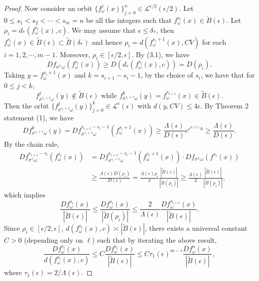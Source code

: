 \documentclass[11pt,oneside]{article}
\theoremstyle{plain}
\numberwithin{equation}{section}
\numberwithin{figure}{section}
\numberwithin{table}{section}
\begin{document}
\begin{proof}
Now consider an orbit $\{ f_{\omega}^j(x)\}_{j=0}^n \in \mathcal L^{\epsilon/2}(\epsilon/2)$. Let $0 \leq s_1 < s_2 < \cdots < s_m = n$ be all the integers such that $f_{\omega}^{s_i}(x) \in \tilde B(\epsilon)$. Let $\rho_i = d_*(f_{\omega}^{s_i}(x), c)$. We may assume that $\epsilon \leq \delta_*$, then $f_{\omega}^{s_i}(x) \in \tilde B(\epsilon) \subset \tilde B(\delta_*)$ and hence  $\rho_i = d (f_{\omega}^{s_i+1}(x), CV)$ for each $i = 1, 2, \cdots, m-1$. Moreover, $\rho_i \in [\epsilon/2, \epsilon]$. By (3.1), we have
\[
Df_{\sigma^{s_i} \omega}(f_{\omega}^{s_i}(x)) \geq D(d_*(f_{\omega}^{s_i}(x), c)) = D(\rho_i).
\]
Taking $y = f_{\omega}^{s_i+1}(x)$ and $k = s_{i+1} - s_i -1$, by the choice of $s_i$, we have that for $0 \leq j < k$,
\[
f_{\sigma^{s_i +1}\omega}^j (y) \notin \tilde B(\epsilon) \text{ while } f_{\sigma^{s_i +1}\omega}^k(y) = f_{\omega}^{s_{i+1}}(x) \in \tilde B(\epsilon). 
\]
Then the orbit $\{f_{\sigma^{s_i +1}\omega}^j (y) \}_{j=0}^k \in \mathcal L^{\epsilon}(\epsilon)$ with $d(y, CV) \leq 4\epsilon$. By Theorem 2 statement (1), we have  
\[
Df_{\sigma^{s_i +1}\omega}^k (y) = Df_{\sigma^{s_i +1}\omega}^{s_{i+1} - s_i -1}(f_{\omega}^{s_i+1}(x)) \geq \frac{\Lambda(\epsilon)}{D(\epsilon)} e^{\epsilon^{\alpha(\epsilon)}k} \geq \frac{\Lambda(\epsilon)}{D(\epsilon)}.
\]
By the chain rule,
\begin{align*}
Df_{\sigma^{s_i} \omega}^{s_{i+1} - s_i }(f_{\omega}^{s_i}(x)) & = Df_{\sigma^{s_i +1}\omega}^{s_{i+1} - s_i -1}(f_{\omega}^{s_i+1}(x)) \cdot Df_{\sigma^{s_i}\omega}(f^{s_i}(x)) \\ & 
\geq \frac{\Lambda(\epsilon) D(\rho_i)}{D(\epsilon)} 
= \frac{\Lambda(\epsilon) \rho_i}{\delta} \frac{|\tilde B(\epsilon)|}{|\tilde B(\rho_i)|} \geq \frac{\Lambda(\epsilon) }{2} \frac{|\tilde B(\epsilon)|}{|\tilde B(\rho_i)|},
\end{align*}
which implies 
\[
\frac{Df_{\omega}^{s_i}(x)}{|\tilde B(\epsilon)|} \leq \frac{Df_{\omega}^{s_i}(x)}{|\tilde B(\rho_i)|} \leq \frac{2}{\Lambda(\epsilon)} \frac{Df_{\omega}^{s_{i+1}}(x)}{|\tilde B(\epsilon)|}.
\]
Since $\rho_i \in [\epsilon/2, \epsilon]$, $d(f_{\omega}^{s_i}(x), c) \asymp |\tilde B(\epsilon)|$, there exists a universal constant $C>0$ (depending only on $\ell$) such that by iterating the above result, 
\begin{equation}
\frac{Df_{\omega}^{s_i}(x)}{d(f_{\omega}^{s_i}(x), c)} \leq C \frac{Df_{\omega}^{s_i}(x)}{|\tilde B(\epsilon)|} \leq C \tau_1(\epsilon)^{m-i} \frac{Df_{\omega}^{n}(x)}{|\tilde B(\epsilon)|}, 
\end{equation}
where $\tau_1(\epsilon) = 2/\Lambda(\epsilon)$.



\end{proof}
\end{document}
